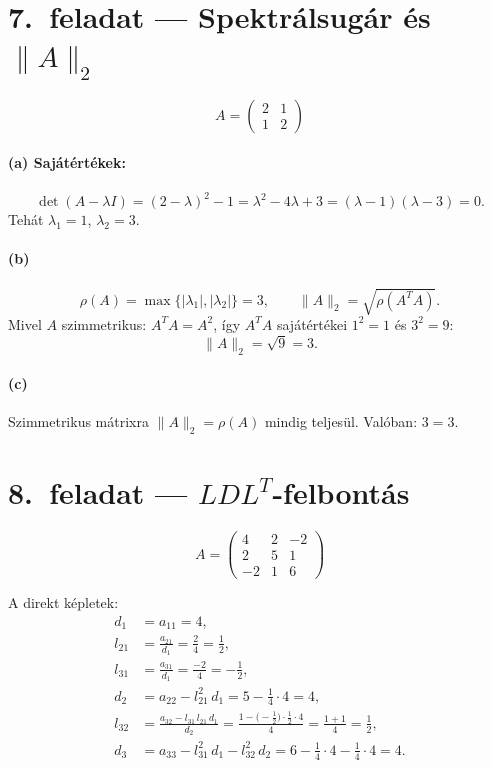 \documentclass[a4paper,12pt]{article}
\begin{document}
\section*{7.\ feladat --- Spektrálsugár és $\lVert A \rVert_2$}

\[
A = \begin{pmatrix} 2 & 1 \\ 1 & 2 \end{pmatrix}
\]

\paragraph{(a) Sajátértékek:}
\[
\det(A - \lambda I) = (2-\lambda)^2 - 1 = \lambda^2 - 4\lambda + 3 = (\lambda-1)(\lambda-3) = 0.
\]
Tehát $\lambda_1 = 1$, $\lambda_2 = 3$.

\paragraph{(b)}
\[
\rho(A) = \max\{|\lambda_1|, |\lambda_2|\} = 3, \qquad
\lVert A \rVert_2 = \sqrt{\rho(A^T A)}.
\]
Mivel $A$ szimmetrikus: $A^T A = A^2$, így $A^T A$ sajátértékei $1^2=1$ és $3^2=9$:
\[
\lVert A \rVert_2 = \sqrt{9} = 3.
\]

\paragraph{(c)}
Szimmetrikus mátrixra $\lVert A \rVert_2 = \rho(A)$ mindig teljesül. Valóban: $3 = 3$. \checkmark

\section*{8.\ feladat --- $LDL^T$-felbontás}

\[
A = \begin{pmatrix} 4 & 2 & -2 \\ 2 & 5 & 1 \\ -2 & 1 & 6 \end{pmatrix}
\]

A direkt képletek:
\begin{align}
d_1 &= a_{11} = 4, \\[4pt]
l_{21} &= \frac{a_{21}}{d_1} = \frac{2}{4} = \frac{1}{2}, \\[4pt]
l_{31} &= \frac{a_{31}}{d_1} = \frac{-2}{4} = -\frac{1}{2}, \\[4pt]
d_2 &= a_{22} - l_{21}^2\,d_1 = 5 - \frac{1}{4}\cdot 4 = 4, \\[4pt]
l_{32} &= \frac{a_{32} - l_{31}\,l_{21}\,d_1}{d_2} = \frac{1 - \bigl(-\frac{1}{2}\bigr)\!\cdot\!\frac{1}{2}\!\cdot\!4}{4} = \frac{1+1}{4} = \frac{1}{2}, \\[4pt]
d_3 &= a_{33} - l_{31}^2\,d_1 - l_{32}^2\,d_2 = 6 - \frac{1}{4}\cdot 4 - \frac{1}{4}\cdot 4 = 4.
\end{align}
\end{document}
